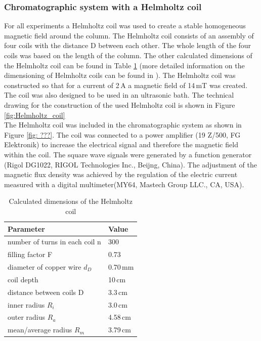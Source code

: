 \subsubsection{Chromatographic system with a Helmholtz coil}
\label{subsubsec:helm_coil}
For all experiments a Helmholtz coil was used to create a stable homogeneous magnetic field around the column. The Helmholtz coil consists of an assembly of four coils with the distance D between each other. The whole length of the four coils was based on the length of the column. The other calculated dimensions of the Helmholtz coil can be found in Table \ref{table:Helmholtz_coil} (more detailed information on the dimensioning of Helmholtz coils can be found in \cite{wotruba1968verbesserung,wotruba1969massive,heller1955erzeugung}). The Helmholtz coil was constructed so that for a current of 2\,A a magnetic field of 14\,mT was created. The coil was also designed to be used in an ultrasonic bath. The technical drawing for the construction of the used Helmholtz coil is shown in Figure \ref{fig:Helmholtz_coil}\\  
The Helmholtz coil was included in the chromatographic system as shown in Figure \ref{fig: ???}. The coil was connected to a power amplifier (19 Z/500, FG Elektronik) to increase the electrical signal and therefore the magnetic field within the coil. The square wave signals were generated by a function generator (Rigol DG1022, RIGOL Technologies Inc., Beijng, China). The adjustment of the magnetic flux density was achieved by the regulation of the electric current measured with a digital multimeter(MY64, Mastech Group LLC., CA, USA).   

\begin{table}[H]
\centering
\caption[Dimensions of the Helmholtz coil]{Calculated dimensions of the Helmholtz coil}
\label{table:Helmholtz_coil}
\begin{tabular}{ll}\hline
Parameter &  Value \\
\hline\hline
 number of turns in each coil n & 300 \\
 filling factor F & 0.73\\
 diameter of copper wire $d_{D}$ & 0.70\,mm\\
 coil depth & 10\,cm\\
 distance between coils D & 3.3\,cm \\
 inner radius $R_{i}$ & 3.0\,cm\\ 
 outer radius $R_{a}$ & 4.58\,cm\\
 mean/average radius $R_{m}$ & 3.79\,cm\\
 \hline
\end{tabular}
\end{table}


